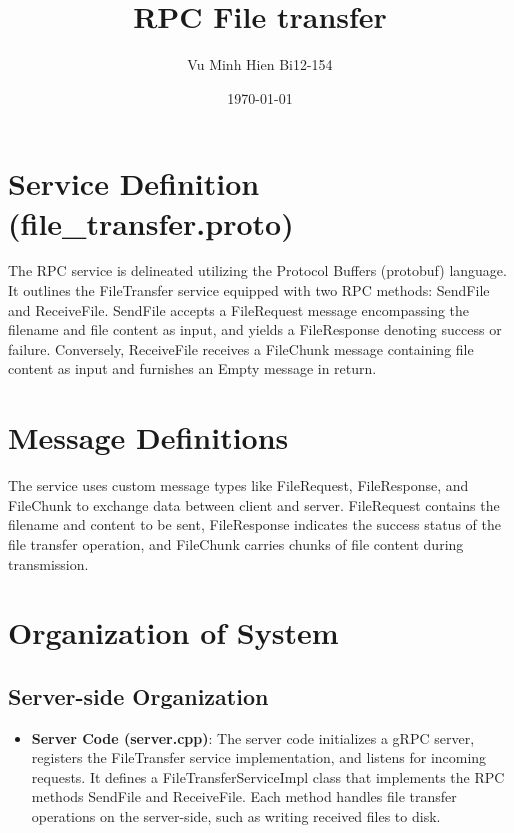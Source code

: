 \documentclass{article}
\begin{document}
\title{RPC File transfer}
\author{Vu Minh Hien Bi12-154}
\date{\today}

\maketitle


\maketitle

\section{Service Definition (file\_transfer.proto)}
The RPC service is delineated utilizing the Protocol Buffers (protobuf) language. It outlines the FileTransfer service equipped with two RPC methods: SendFile and ReceiveFile. SendFile accepts a FileRequest message encompassing the filename and file content as input, and yields a FileResponse denoting success or failure. Conversely, ReceiveFile receives a FileChunk message containing file content as input and furnishes an Empty message in return.

\section{Message Definitions}
The service uses custom message types like FileRequest, FileResponse, and FileChunk to exchange data between client and server. FileRequest contains the filename and content to be sent, FileResponse indicates the success status of the file transfer operation, and FileChunk carries chunks of file content during transmission.

\section{Organization of System}

\subsection{Server-side Organization}
\begin{itemize}
    \item \textbf{Server Code (server.cpp)}: The server code initializes a gRPC server, registers the FileTransfer service implementation, and listens for incoming requests. It defines a FileTransferServiceImpl class that implements the RPC methods SendFile and ReceiveFile. Each method handles file transfer operations on the server-side, such as writing received files to disk.
\end{itemize}
\end{document}
